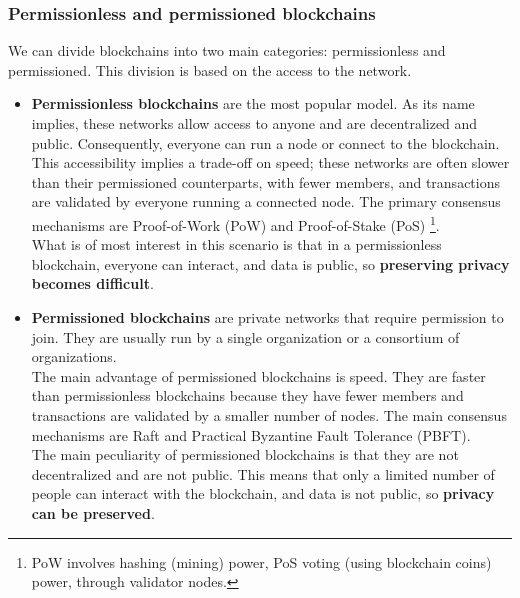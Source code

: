 \subsubsection{Permissionless and permissioned blockchains}
We can divide blockchains into two main categories: permissionless and permissioned.
This division is based on the access to the network.
\begin{itemize}
    \item \textbf{Permissionless blockchains} are the most popular model. As its name implies, these 
    networks allow access to anyone and are decentralized and public. Consequently, 
    everyone can run a node or connect to the blockchain.\\
    This accessibility implies a trade-off on speed; these networks are often slower than 
    their permissioned counterparts, with fewer members, and transactions are validated by 
    everyone running a connected node. The primary consensus mechanisms are Proof-of-Work 
    (PoW) and Proof-of-Stake (PoS) \footnote{PoW involves hashing (mining) power, PoS voting 
    (using blockchain coins) power, through validator nodes.}.\\
    What is of most interest in this scenario is that in a permissionless blockchain, 
    everyone can interact, and data is public, so \textbf{preserving privacy becomes difficult}.
    \item \textbf{Permissioned blockchains} are private networks that require permission to
    join. They are usually run by a single organization or a consortium of organizations.\\
    The main advantage of permissioned blockchains is speed. They are faster than
    permissionless blockchains because they have fewer members and transactions are
    validated by a smaller number of nodes. The main consensus mechanisms are Raft and 
    Practical Byzantine Fault Tolerance (PBFT).\\
    The main peculiarity of permissioned blockchains is that they are not decentralized
    and are not public. This means that only a limited number of people can interact with
    the blockchain, and data is not public, so \textbf{privacy can be preserved}.
\end{itemize}

